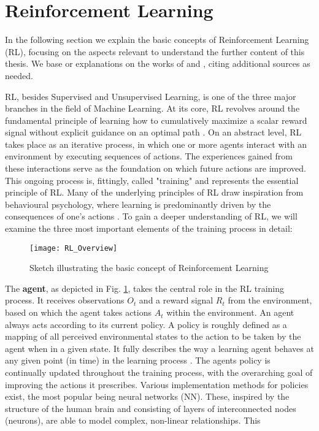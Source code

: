 \section{Reinforcement Learning} \label{sec: Reinforcement Learning}
In the following section we explain the basic concepts of Reinforcement Learning (RL), focusing on the aspects relevant to understand the further content of this thesis.
We base or explanations on the works of \cite{sutton2018reinforcement} and \cite{silver2015}, citing additional sources as needed.

RL, besides Supervised and Unsupervised Learning, is one of the three major branches in the field of Machine Learning.
At its core, RL revolves around the fundamental principle of learning how to cumulatively maximize a scalar reward signal without explicit guidance on an optimal path \parencite{sutton2018reinforcement}.
On an abstract level, RL takes place as an iterative process, in which one or more agents interact with an environment by executing sequences of actions.
The experiences gained from these interactions serve as the foundation on which future actions are improved.
This ongoing process is, fittingly, called "training" and represents the essential principle of RL.
Many of the underlying principles of RL draw inspiration from behavioural psychology, where learning is predominantly driven by the consequences of one's actions \parencite{sutton2018reinforcement, joshi2021reinforcement}.
To gain a deeper understanding of RL, we will examine the three most important elements of the training process in detail:

\begin{figure}[h]
	\centerline{\texttt{[image: RL\_Overview]}}
	\caption{Sketch illustrating the basic concept of Reinforcement Learning}
	\label{figure: RL Illustration}
\end{figure}


The \textbf{agent}, as depicted in Fig. \ref{figure: RL Illustration}, takes the central role in the RL training process.
It receives observations $O_t$ and a reward signal $R_t$ from the environment, based on which the agent takes actions $A_t$ within the environment.
An agent always acts according to its current policy.
A policy is roughly defined as a mapping of all perceived environmental states to the action to be taken by the agent when in a given state.
It fully  describes the way a learning agent behaves at any given point (in time) in the learning process \parencite{sutton2018reinforcement, silver2015}.
The agents policy is continually updated throughout the training process, with the overarching goal of improving the actions it prescribes.
Various implementation methods for policies exist, the most popular being neural networks (NN).
These, inspired by the structure of the human brain and consisting of layers of interconnected nodes (neurons), are able to model complex, non-linear relationships.
This 


